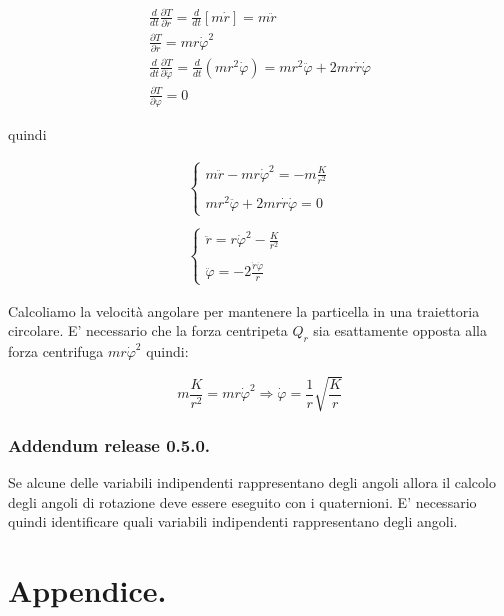 \documentclass[a4paper,twoside]{article}
\begin{document}
\begin{eqnarray}
\frac{d}{dt}\frac{\partial T}{\partial\dot r}=\frac{d}{dt}[m\dot r]=m\ddot r
\\
\frac{\partial T}{\partial r}=mr\dot\varphi^2
\\
\frac{d}{dt}\frac{\partial T}{\partial\dot \varphi}=\frac{d}{dt}(mr^2\dot\varphi)
=mr^2\ddot\varphi+2mr\dot r\dot\varphi
\\
\frac{\partial T}{\partial \varphi}=0
\end{eqnarray}

quindi

\begin{equation}
\begin{array}{l}
\left\{
\begin{array}{l}
m\ddot r-mr\dot\varphi^2=-m\frac{K}{r^2}
\\
\\
mr^2\ddot\varphi +2mr\dot r\dot\varphi = 0
\end{array}
\right.
\\
\\
\left\{
\begin{array}{l}
\ddot r=r\dot \varphi^2-\frac{K}{r^2}
\\
\\
\ddot\varphi  = -2\frac{\dot r\dot\varphi}{r}
\end{array}
\right.
\end{array}
\end{equation}

Calcoliamo la velocità angolare per mantenere la particella in una traiettoria circolare. E' necessario che la forza centripeta $Q_r$ sia esattamente opposta alla forza centrifuga
$mr\dot \varphi^2$ quindi:

\begin{equation}
m \frac{K}{r^2} = m r \dot \varphi^2 \Rightarrow \dot \varphi = \frac{1}{r} \sqrt {\frac{K}{r}}
\end{equation}


\section{Addendum release 0.5.0.}

Se alcune delle variabili indipendenti rappresentano degli angoli allora il calcolo degli angoli di rotazione
deve essere eseguito con i quaternioni.
E' necessario quindi identificare quali variabili indipendenti rappresentano degli angoli.


\pagebreak
\appendix
\part{Appendice.}
\end{document}
